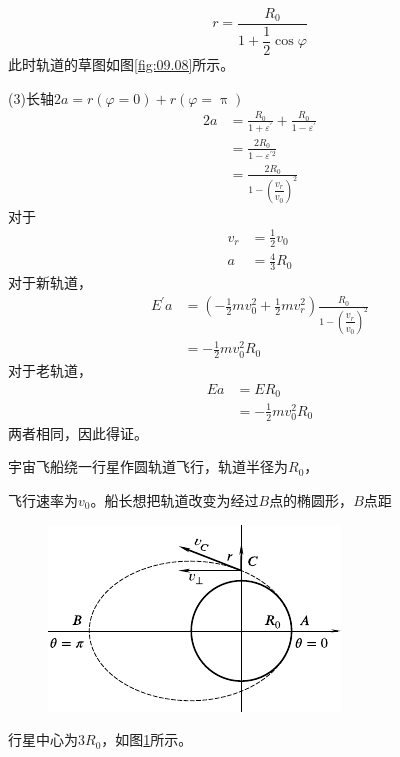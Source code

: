 \begin{equation*}
  r = \frac { R _ { 0 } } { 1 + \dfrac { 1 } { 2 } \cos \varphi }
\end{equation*}
此时轨道的草图如图\ref{fig:09.08}所示。

(3)长轴$ 2 a = r \left( \varphi = 0 \right) + r \left( \varphi = \uppi \right) $
\begin{equation*}
  \begin{split}
    2 a &= \frac { R _ { 0 } } { 1 + \varepsilon ^ { \prime } } + \frac { R _ { 0 } } { 1 - \varepsilon ^ { \prime } } \\
    &= \frac { 2 R _ { 0 } } { 1 - \varepsilon ^ { \prime 2 } } \\
    &= \frac { 2 R _ { 0 } } { 1 - \left( \dfrac { v _ { r } } { v _ { 0 } } \right) ^ { 2 }}
  \end{split}
\end{equation*}
对于
\begin{align*}
  v _ { r } & = \frac { 1 } { 2 } v _ { 0 } \\
  a         & = \frac { 4 } { 3 } R _ { 0 }
\end{align*}
对于新轨道，
\begin{equation*}
  \begin{split}
    E^{\prime} a &=\left(-\frac{1}{2} m v_{0}^{2}+\frac{1}{2} m v_{r}^{2}\right) \frac{R_{0}}{1-\left(\dfrac{v_{r}}{v_{0}}\right)^{2}} \\
    &=-\frac{1}{2} m v_{0}^{2} R_{0}
  \end{split}
\end{equation*}
对于老轨道，
\begin{equation*}
  \begin{split}
    E a &= E R _ { 0 } \\
    &= - \frac { 1 } { 2 } m v _ 0 ^ { 2 } R _ { 0 }
  \end{split}
\end{equation*}
两者相同，因此得证。


\example 宇宙飞船绕一行星作圆轨道飞行，轨道半径为$ R _ 0 $，

\clearpage\noindent 飞行速率为$ v _ { 0 } $。船长想把轨道改变为经过$ B $点的椭圆形，$ B $点距
\begin{figure}
  \centering
  \includegraphics{figure/fig09.09}
  \caption{}
  \label{fig:09.09}
\end{figure}
行星中心为$ 3 R _ { 0 } $，如图\ref{fig:09.09}所示。

